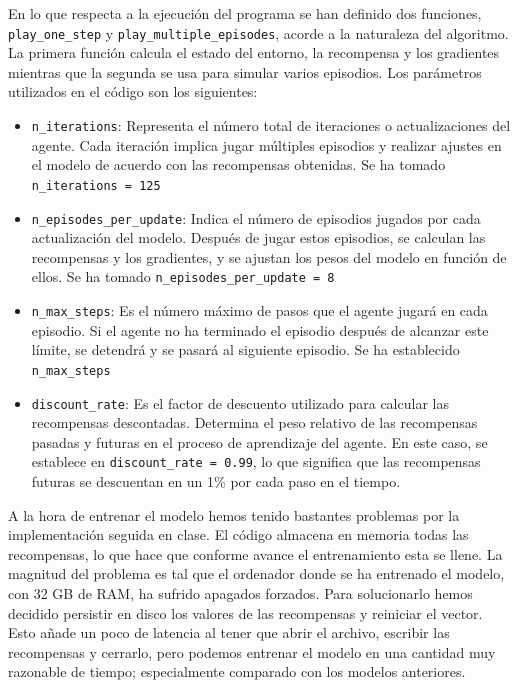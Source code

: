 \documentclass[12pt]{article}
\begin{document}
		En lo que respecta a la ejecución del programa se han definido dos funciones, \verb|play_one_step| y \verb|play_multiple_episodes|, acorde a la naturaleza del algoritmo. La primera función calcula el estado del entorno, la recompensa y los gradientes mientras que la segunda se usa para simular varios episodios. Los parámetros utilizados en el código son los siguientes:
		\begin{itemize}
			\item \verb|n_iterations|: Representa el número total de iteraciones o actualizaciones del agente. Cada iteración implica jugar múltiples episodios y realizar ajustes en el modelo de acuerdo con las recompensas obtenidas. Se ha tomado \verb|n_iterations = 125|
		
			\item \verb|n_episodes_per_update|: Indica el número de episodios jugados por cada actualización del modelo. Después de jugar estos episodios, se calculan las recompensas y los gradientes, y se ajustan los pesos del modelo en función de ellos. Se ha tomado \verb|n_episodes_per_update = 8|
		
			\item \verb|n_max_steps|: Es el número máximo de pasos que el agente jugará en cada episodio. Si el agente no ha terminado el episodio después de alcanzar este límite, se detendrá y se pasará al siguiente episodio. Se ha establecido \verb|n_max_steps|
		
			\item \verb|discount_rate|: Es el factor de descuento utilizado para calcular las recompensas descontadas. Determina el peso relativo de las recompensas pasadas y futuras en el proceso de aprendizaje del agente. En este caso, se establece en \verb|discount_rate = 0.99|, lo que significa que las recompensas futuras se descuentan en un 1\% por cada paso en el tiempo.
		\end{itemize}

		A la hora de entrenar el modelo hemos tenido bastantes problemas por la implementación seguida en clase. El código almacena en memoria todas las recompensas, lo que hace que conforme avance el entrenamiento esta se llene. La magnitud del problema es tal que el ordenador donde se ha entrenado el modelo, con 32 GB de RAM, ha sufrido apagados forzados. Para solucionarlo hemos decidido persistir en disco los valores de las recompensas y reiniciar el vector. Esto añade un poco de latencia al tener que abrir el archivo, escribir las recompensas y cerrarlo, pero podemos entrenar el modelo en una cantidad muy razonable de tiempo; especialmente comparado con los modelos anteriores.
		
\end{document}
